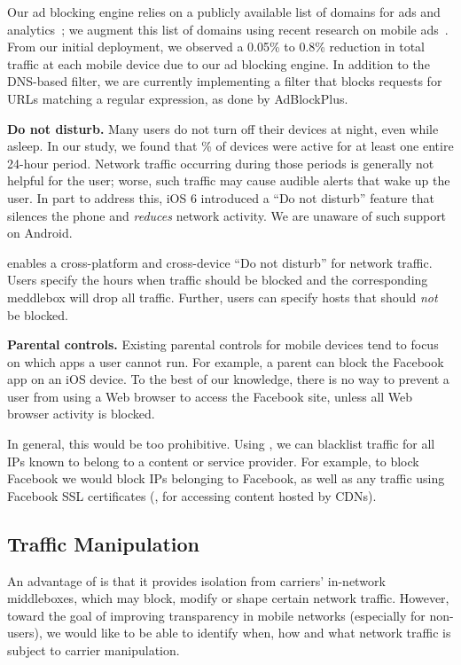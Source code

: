 
Our ad blocking engine relies on a publicly available list of domains for ads and
analytics~\cite{YoyoAds}; we augment this list of domains using 
recent research on mobile ads~\cite{hornyack:appfence,
  Leontiadis:2012:AdsMobile}. From our initial deployment, we observed a 0.05\% to 0.8\% reduction
in total traffic at each mobile device due to our ad blocking engine. 
In addition to the DNS-based filter, we are currently implementing a filter that blocks 
requests for URLs matching a regular expression, as done by AdBlockPlus.


\noindent\textbf{Do not disturb.} 
Many users do not turn off their devices at night, even while asleep. In our study, we found that 
\% of devices were active for at least one entire 24-hour period. Network 
traffic occurring during those periods is generally not helpful for the user; worse, 
such traffic may cause audible alerts that wake up the user. In part to address this, 
iOS 6 introduced a ``Do not disturb'' feature that silences the phone and \emph{reduces} 
network activity. We are unaware of such support on Android.

\meddle enables a cross-platform and cross-device ``Do not disturb'' for network 
traffic. Users specify the hours when traffic should be blocked and the corresponding 
meddlebox will drop all traffic. Further, users can specify hosts that should \emph{not} be 
blocked. 

\noindent\textbf{Parental controls.} 
Existing parental controls for mobile devices tend to focus on which apps a user 
cannot run. For example, a parent can block the Facebook app on an iOS device. 
To the best of our knowledge, there is no way to prevent a user from using a 
Web browser to access the Facebook site, unless all Web browser activity is blocked. 

In general, this would be too prohibitive. Using \meddle, we can blacklist traffic for 
all IPs known to belong to a content or service provider. For example, to block 
Facebook we would block IPs belonging to Facebook, as well as any traffic using Facebook 
SSL certificates (\eg, for accessing content hosted by CDNs). 

\subsection{Traffic Manipulation}
An advantage of \meddle is that it provides isolation from carriers' in-network 
middleboxes, which may block, modify or shape certain network traffic. However, 
toward the goal of improving transparency in mobile networks (especially for 
non-\meddle users), we would like to be able to identify when, how and what 
network traffic is subject to carrier manipulation. 

